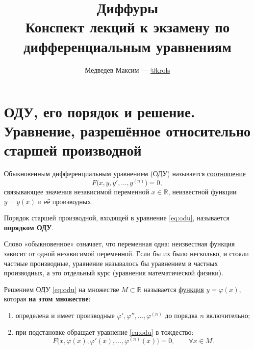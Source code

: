 \documentclass[12pt,a4paper]{article}
\title{\textbf{Диффуры}\\[0.3em]\large Конспект лекций к экзамену по дифференциальным уравнениям}
\author{Медведев Максим --- \href{https://t.me/krols}{@krols}}
\date{}
\numberwithin{equation}{section}
\newcommand{\R}{\mathbb{R}}
\DeclareRobustCommand{\examtag}[1]{\space{\normalfont\small\color{HSEgray}(#1)}}
\begin{document}
\maketitle
\begingroup
\small
\makeatletter
{}
\makeatother
\renewcommand{\contentsname}{Оглавление}
\tableofcontents
\endgroup
\clearpage

\section[ОДУ, его порядок, решение и нормальная форма\examtag{вопрос~1}]{ОДУ, его порядок и решение. Уравнение, разрешённое относительно старшей производной\examtag{вопрос~1}}

\begin{definitionHSE}
Обыкновенным дифференциальным уравнением (ОДУ) называется \underline{соотношение}
\begin{equation}
F\bigl(x,y,y',\ldots,y^{(n)}\bigr)=0,
\label{eq:odu}
\end{equation}
связывающее значения независимой переменной $x\in\R$, неизвестной функции $y=y(x)$ и её производных.

Порядок старшей производной, входящей в уравнение \eqref{eq:odu}, называется \textbf{порядком ОДУ}.
\end{definitionHSE}

Слово «обыкновенное» означает, что переменная одна: неизвестная функция зависит от одной независимой переменной. Если бы их было несколько, и стояли частные производные, уравнение называлось бы уравнением в частных производных, а это отдельный курс (уравнения математической физики).

\begin{definitionHSE}
Решением ОДУ \eqref{eq:odu} на множестве $M\subset\R$ называется \underline{функция} $y=\varphi(x)$, которая \textbf{на этом множестве}:
\begin{enumerate}
  \item определена и имеет производные \(\varphi',\varphi'',\ldots,\varphi^{(n)}\) до порядка $n$ включительно;
  \item при подстановке обращает уравнение \eqref{eq:odu} в тождество:
  \[
  F\bigl(x,\varphi(x),\varphi'(x),\ldots,\varphi^{(n)}(x)\bigr)=0,
  \qquad \forall x\in M.
  \]
\end{enumerate}
\end{definitionHSE}
\end{document}
